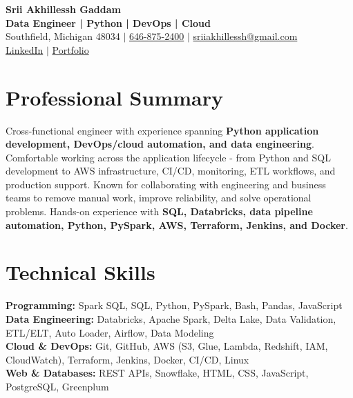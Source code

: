 \documentclass[letterpaper,10pt]{article}
\begin{document}
\fontsize{9.35pt}{10.45pt}\selectfont

\begin{center}
    {\LARGE \textbf{Srii Akhillessh Gaddam}} \\[-1pt]
    \textbf{Data Engineer | Python | DevOps | Cloud} \\[2pt]
    Southfield, Michigan 48034 $|$
    \href{tel:6468752400}{646-875-2400} $|$
    \href{mailto:sriiakhillessh@gmail.com}{sriiakhillessh@gmail.com} \\[1pt]
    \href{https://www.linkedin.com/in/srii-akhiilessh-gaddam-b48668191/}{LinkedIn} $|$
    \href{https://sriiakhillesshg.github.io/portfolio/}{Portfolio}
\end{center}
\vspace{-8pt}

\section{Professional Summary}
\small{Cross-functional engineer with experience spanning \textbf{Python application development, DevOps/cloud automation, and data engineering}. Comfortable working across the application lifecycle - from Python and SQL development to AWS infrastructure, CI/CD, monitoring, ETL workflows, and production support. Known for collaborating with engineering and business teams to remove manual work, improve reliability, and solve operational problems. Hands-on experience with \textbf{SQL, Databricks, data pipeline automation, Python, PySpark, AWS, Terraform, Jenkins, and Docker}.}

\section{Technical Skills}
\small{
\textbf{Programming:} Spark SQL, SQL, Python, PySpark, Bash, Pandas, JavaScript \\
\textbf{Data Engineering:} Databricks, Apache Spark, Delta Lake, Data Validation, ETL/ELT, Auto Loader, Airflow, Data Modeling \\
\textbf{Cloud \& DevOps:} Git, GitHub, AWS (S3, Glue, Lambda, Redshift, IAM, CloudWatch), Terraform, Jenkins, Docker, CI/CD, Linux \\
\textbf{Web \& Databases:} REST APIs, Snowflake, HTML, CSS, JavaScript, PostgreSQL, Greenplum
}

\end{document}
